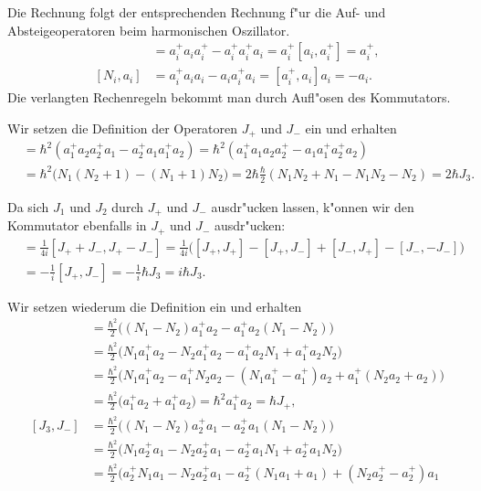 \begin{loesung}
\begin{teilaufgaben}
\item Die Rechnung folgt der entsprechenden Rechnung f"ur die Auf- und
Absteigeoperatoren beim harmonischen Oszillator.
\begin{align*}
[N_i,a_i^+]
&=
a_i^+a_ia_i^+-a_i^+a_i^+a_i
=
a_i^+[a_i,a_i^+]=a_i^+,
\\
[N_i,a_i]
&=
a_i^+a_ia_i-a_ia_i^+a_i
=
[a_i^+,a_i]a_i
=-a_i.
\end{align*}
Die verlangten Rechenregeln bekommt man durch Aufl"osen des Kommutators.
\item
Wir setzen die Definition der Operatoren $J_+$ und $J_-$ ein und
erhalten
\begin{align*}
[J_+,J_-]
&=
\hbar^2(a_1^+a_2a_2^+a_1 - a_2^+a_1a_1^+a_2)
=
\hbar^2(a_1^+a_1 a_2a_2^+ - a_1a_1^+ a_2^+a_2)
\\
&=
\hbar^2\bigg(N_1(N_2+1)- (N_1+1)N_2\bigg)
=2\hbar\frac{\hbar}2(N_1N_2+N_1-N_1N_2-N_2)=2\hbar J_3.
\end{align*}
\item
Da sich $J_1$ und $J_2$ durch $J_+$ und $J_-$ ausdr"ucken lassen,
k"onnen wir den Kommutator ebenfalls in $J_+$ und $J_-$
ausdr"ucken:
\begin{align*}
[J_1,J_2]
&=
\frac{1}{4i}[J_++J_-,J_+-J_-]
=
\frac{1}{4i}\bigl(
[J_+,J_+] -[J_+,J_-] +[J_-,J_+] -[J_-,-J_-]
\bigr)
\\
&=
-\frac1{i}[J_+,J_-]
=
-\frac1{i}\hbar J_3
=i\hbar J_3.
\end{align*}
\item
Wir setzen wiederum die Definition ein und erhalten
\begin{align*}
[J_3,J_+]
&=
\frac{\hbar^2}2\bigl(
(N_1-N_2) a_1^+a_2 - a_1^+a_2 (N_1-N_2)
\bigr)
\\
&=
\frac{\hbar^2}2\bigl(
N_1 a_1^+a_2 - N_2 a_1^+ a_2 - a_1^+a_2 N_1 + a_1^+a_2 N_2
\bigr)
\\
&=
\frac{\hbar^2}2\bigl(
N_1a_1^+ a_2
-
a_1^+ N_2 a_2
-
(N_1a_1^+-a_1^+)a_2
+
a_1^+(N_2a_2 +a_2)
\bigl)
\\
&=\frac{\hbar^2}{2}
\bigl( a_1^+a_2 +a_1^+a_2
\bigr)
=\hbar^2 a_1^+a_2=\hbar J_+,
\\
[J_3,J_-]
&=
\frac{\hbar^2}2\bigl(
(N_1-N_2) a_2^+a_1 - a_2^+a_1 (N_1-N_2)
\bigr)
\\
&=
\frac{\hbar^2}2\bigl(
N_1 a_2^+a_1 - N_2 a_2^+ a_1 - a_2^+a_1 N_1 + a_2^+a_1 N_2
\bigr)
\\
&=
\frac{\hbar^2}2\bigl( 
a_2^+N_1 a_1 - N_2 a_2^+ a_1 - a_2^+(N_1a_1+a_1) + (N_2a_2^+-a_2^+)a_1

\end{align*}
\end{teilaufgaben}
\end{loesung}
